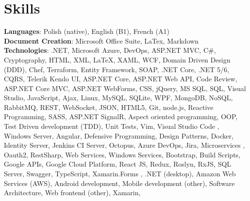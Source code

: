 \documentclass[A4,11pt]{article}
\begin{document}
\section{Skills}
 \begin{itemize}[leftmargin=0.5cm, label={}]
    \small{\item{
     \textbf{Languages}{: Polish (native), English (B1), French (A1)} \\
     \textbf{Document Creation}{: Microsoft Office Suite, LaTex, Markdown} \\
     \textbf{Technologies}{: .NET, Microsoft Azure, DevOps, ASP.NET MVC, C\#, Cryptography, 
     HTML, XML, LaTeX, XAML, WCF, Domain Driven Design (DDD), Chef, Terraform, Entity Framework, 
     SOAP, .NET Core, .NET 5/6, CQRS, Telerik Kendo UI, ASP.NET Core, ASP.NET Web API, 
     Code Review, ASP.NET Core MVC, ASP.NET WebForms, CSS, jQuery, 
     MS SQL, SQL, Visual Studio, JavaScript, Ajax, Linux, MySQL, SQLite, 
     WPF, MongoDB, NoSQL, RabbitMQ, REST, WebSocket, JSON, HTML5, Git, 
     node.js, Reactive Programming, SASS, ASP.NET SignalR, 
     Aspect oriented programming, OOP, Test Driven development (TDD), 
     Unit Tests, Vim, Visual Studio Code , Windows Server, Angular,
     Defensive Programming, Design Patterns, Docker, Identity Server, 
     Jenkins CI Server, Octopus, Azure DevOps, Jira, Microservices , Oauth2, 
     RestSharp, Web Services, Windows Services, Bootstrap, 
     Build Scripts, Google APIs, Google Cloud Platform, 
     React JS, Redux, Roslyn, RxJS, SQL Server, Swagger, TypeScript, 
     Xamarin.Forms , .NET (desktop), Amazon Web Services (AWS), 
     Android development, Mobile development (other), Software Architecture,
     Web frontend (other), Xamarin, } \\
    }}
 \end{itemize}
    
\end{document}
